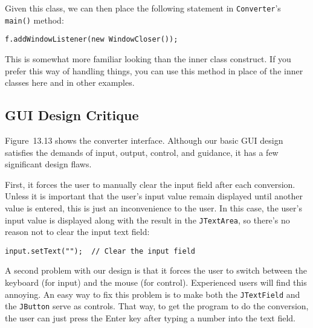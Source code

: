 \noindent Given this class, we can then place the following statement
in {\tt Converter}'s {\tt main()} method:

\begin{jjjlisting}
\begin{lstlisting}
f.addWindowListener(new WindowCloser());
\end{lstlisting}
\end{jjjlisting}

\noindent This is somewhat more familiar looking than the inner class
construct. If you prefer this way of handling things, you can use this
method in place of the inner classes here and in other examples.


\pagebreak
\subsection{GUI Design Critique}
\noindent Figure~13.13 shows the converter interface.
Although our basic GUI design satisfies the demands of input, output,
control, and guidance, it has a few significant design flaws.

First, it forces the user to manually clear the input field after each
conversion.  Unless it is important that the user's input value remain
displayed until another value is entered, this is just an
inconvenience to the user.  In this case, the user's input value is
displayed along with the result in the {\tt JTextArea}, so there's no
reason not to clear the input text field:

\begin{jjjlisting}
\begin{lstlisting}
input.setText("");  // Clear the input field
\end{lstlisting}
\end{jjjlisting}


A second problem with our design is that it forces the user to switch
between the keyboard (for input) and the mouse (for
control). Experienced users will find this annoying.   An easy way to
fix this problem is to make both the {\tt JTextField} and the
{\tt JButton} serve as controls.  That way, to get the program to do the
conversion, the user can just press the Enter key after typing a
number into the text field.


